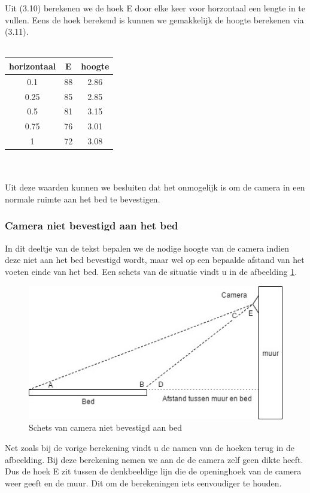 Uit (3.10) berekenen we de hoek E door elke keer voor horzontaal een lengte in te vullen. Eens de hoek berekend is kunnen we gemakkelijk de hoogte berekenen via (3.11). \\
\\
\begin{tabular}{|c|c|c|}
	\hline
	horizontaal & E & hoogte \\ \hline
	0.1 & 88 & 2.86 \\ \hline
	0.25 & 85 & 2.85 \\ \hline
	0.5 & 81 & 3.15 \\ \hline
	0.75 & 76 & 3.01 \\ \hline
	1 &  72 & 3.08 \\
	\hline
\end{tabular}
\\
\\Uit deze waarden kunnen we besluiten dat het onmogelijk is om de camera in een normale ruimte aan het bed te bevestigen.

\subsubsection{Camera niet bevestigd aan het bed}
In dit deeltje van de tekst bepalen we de nodige hoogte van de camera indien deze niet aan het bed bevestigd wordt, maar wel op een bepaalde afstand van het voeten einde van het bed. Een schets van de situatie vindt u in de afbeelding \ref{imgCNB}. 
\begin{figure}[h]
	\includegraphics[scale=0.75]{CameraNietAanBed}
	\caption{Schets van camera niet bevestigd aan bed}
	\label{imgCNB}
\end{figure}
Net zoals bij de vorige berekening vindt u de namen van de hoeken terug in de afbeelding. Bij deze berekening nemen we aan de de camera zelf geen dikte heeft. Dus de hoek E zit tussen de denkbeeldige lijn die de openinghoek van de camera weer geeft en de muur. Dit om de berekeningen iets eenvoudiger te houden. 

